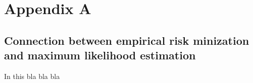 \chapter*{Appendix A}
\section*{Connection between empirical risk minization and maximum likelihood estimation}
In this bla bla bla
